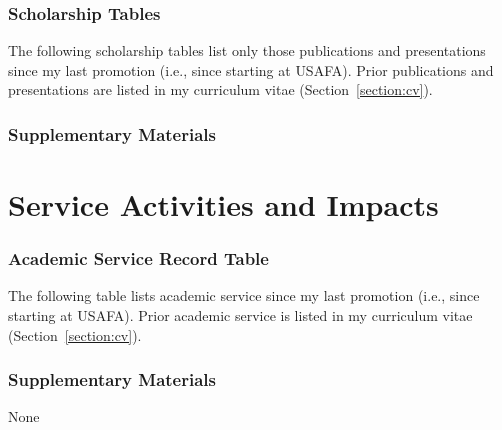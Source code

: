 \documentclass[11pt,titlepage]{article}
\begin{document}
\section{Scholarship Tables}
The following scholarship tables list only those publications and presentations since my last promotion (i.e., since starting at \gls{USAFA}).
Prior publications and presentations are listed in my curriculum vitae (Section~\ref{section:cv}).



\section{Supplementary Materials}

\begin{supplements}[
    directory=supplements/scholarship/,
    structure=enumerate,
    type=publications,
]
\end{supplements}


\part{Service Activities and Impacts}\label{section:service}  %

\section{Academic Service Record Table}  %
The following table lists academic service since my last promotion (i.e., since starting at \gls{USAFA}).
Prior academic service is listed in my curriculum vitae (Section~\ref{section:cv}).



\section{Supplementary Materials}  %

None




\end{document}
